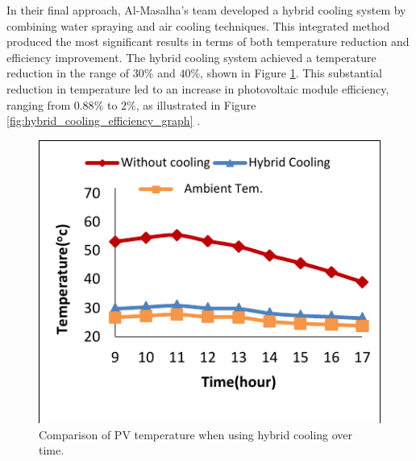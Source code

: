 In their final approach, Al-Masalha's team developed a hybrid cooling system by combining water spraying and air cooling techniques. This integrated method produced the most significant results in terms of both temperature reduction and efficiency improvement. The hybrid cooling system achieved a temperature reduction in the range of $30\%$ and $40\%$, shown in Figure \ref{fig:hybrid_cooling_temperature_graph}. This substantial reduction in temperature led to an increase in photovoltaic module efficiency, ranging from $0.88\%$ to $2\%$, as illustrated in Figure \ref{fig:hybrid_cooling_efficiency_graph} \cite{Al-Masalha2024ImprovingSystems}.

\begin{figure}[H]
    \centering
    \begin{minipage}[b]{0.45\linewidth}
        \centering
        \includegraphics[width=\linewidth]{Figures/hybrid_cooling_temperature_graph.pdf}
        \caption{Comparison of PV temperature when using hybrid cooling over time. \cite{Al-Masalha2024ImprovingSystems}}
        \label{fig:hybrid_cooling_temperature_graph}
    \end{minipage}
    \hfill
    \begin{minipage}[b]{0.45\linewidth}
        \centering

\end{minipage}
\end{figure}

